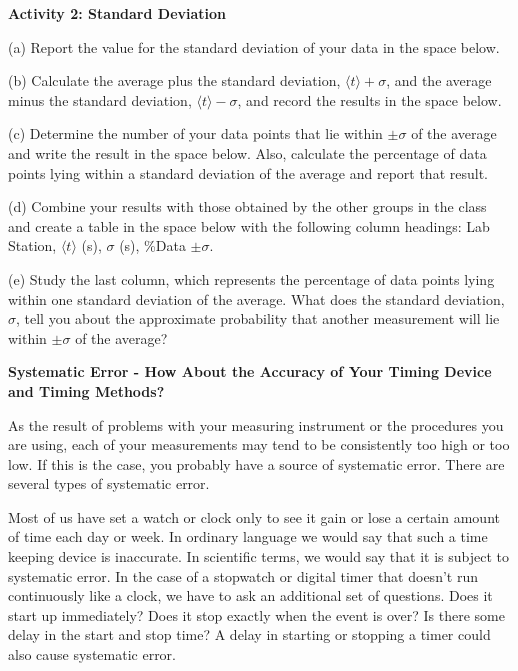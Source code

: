 \textbf{Activity 2: Standard Deviation} 

(a) Report the value for the standard deviation of your data in the space below.
\vspace{10mm}

(b) Calculate the average plus the standard deviation, \(\langle t\rangle 
+ \sigma  \),
and the average minus the standard deviation, \(\langle t\rangle - \sigma  \), 
and record
the results in the space below.
\vspace{10mm}

(c) Determine the number of your data points that lie within \( \pm \sigma  \)
of the average and write the result in the space below. Also, calculate the
percentage of data points lying within a standard deviation of the average and
report that result.
\vspace{10mm}

(d) Combine your results with those obtained by the other groups in the class
and create a table in the space below with the following column headings: Lab
Station, \( \langle t\rangle\) (s), \( \sigma  \) (s), \%Data \( \pm \sigma  \).
\vspace{50mm}

(e) Study the last column, which represents the percentage of data points lying
within one standard deviation of the average. What does the standard deviation,
\( \sigma  \), tell you about the approximate probability that another measurement
will lie within \( \pm \sigma  \) of the average?
\vspace{20mm}

\textbf{Systematic Error - How About the Accuracy of Your Timing Device and
Timing Methods?} 

As the result of problems with your measuring instrument or the procedures you
are using, each of your measurements may tend to be consistently too high or
too low. If this is the case, you probably have a source of systematic error.
There are several types of systematic error.

Most of us have set a watch or clock only to see it gain or lose a certain amount
of time each day or week. In ordinary language we would say that such a time
keeping device is inaccurate. In scientific terms, we would say that it is subject
to systematic error. In the case of a stopwatch or digital timer that doesn't
run continuously like a clock, we have to ask an additional set of questions.
Does it start up immediately? Does it stop exactly when the event is over? Is
there some delay in the start and stop time? A delay in starting or stopping
a timer could also cause systematic error.

